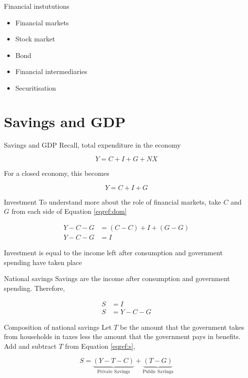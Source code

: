 \documentclass[14pt,xcolor=pdftex,dvipsnames,table]{beamer}\usepackage[]{graphicx}\usepackage[]{color}
\begin{document}
\begin{frame}{Financial instututions}
\begin{itemize}[<+-| alert@+>]
\item Financial markets
\item Stock market
\item Bond
\item Financial intermediaries
\item Securitisation
\end{itemize}
\end{frame}

\section{Savings and GDP}
\begin{frame}{Savings and GDP}
Recall, total expenditure in the economy
\begin{block}{}
\begin{equation}
Y = C + I + G +NX
\end{equation}
\end{block}
For a closed economy, this becomes
\begin{block}{}
\begin{equation}\label{eqref:dom}
Y = C + I + G
\end{equation}
\end{block}
\end{frame}

\begin{frame}{Investment}
To understand more about the role of financial markets, take $C$ and $G$ from each side of Equation \ref{eqref:dom}
\begin{block}{}
\begin{align*}
Y - C - G &= (C - C) + I + (G - G)\\
Y - C - G &= I
\end{align*}
\end{block}
Investment is equal to the income left after consumption and government spending have taken place
\end{frame}

\begin{frame}{National savings}
Savings are the income after consumption and government spending.  Therefore, 
\begin{block}{}
\begin{align*}\label{eqref:s}
S &= I\\
S &= Y - C - G
\end{align*}
\end{block}
\end{frame}

\begin{frame}{Composition of national savings}
Let $T$ be the amount that the government takes from households in taxes less the amount that the government pays in benefits. Add and subtract $T$ from Equation \ref{eqref:s}, 
\begin{block}{}
\begin{equation}
S = \underbrace{(Y - T - C)}_{\text{Private Savings}} + \underbrace{(T -  G)}_{\text{Public Savings}}
\end{equation}
\end{block}
\end{frame}
\end{document}
